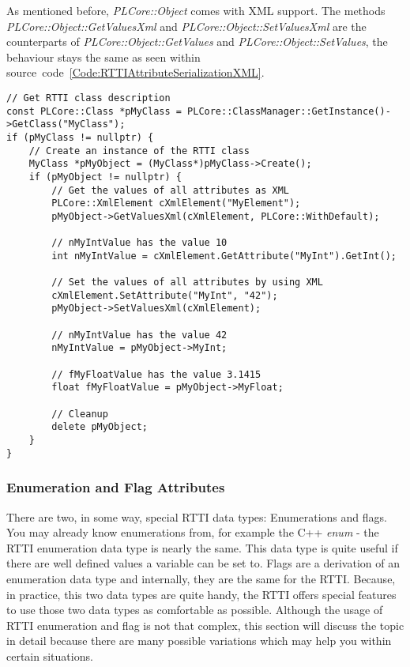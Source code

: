 As mentioned before, \emph{PLCore::Object} comes with XML support. The methods \emph{PLCore::Object::GetValuesXml} and \emph{PLCore::Object::SetValuesXml} are the counterparts of \emph{PLCore::Object::GetValues} and \emph{PLCore::Object::SetValues}, the behaviour stays the same as seen within source~code~\ref{Code:RTTIAttributeSerializationXML}.
\begin{lstlisting}[label=Code:RTTIAttributeSerializationXML,caption={RTTI object attributes serialization by using XML}]
// Get RTTI class description
const PLCore::Class *pMyClass = PLCore::ClassManager::GetInstance()->GetClass("MyClass");
if (pMyClass != nullptr) {
	// Create an instance of the RTTI class
	MyClass *pMyObject = (MyClass*)pMyClass->Create();
	if (pMyObject != nullptr) {
		// Get the values of all attributes as XML
		PLCore::XmlElement cXmlElement("MyElement");
		pMyObject->GetValuesXml(cXmlElement, PLCore::WithDefault);

		// nMyIntValue has the value 10
		int nMyIntValue = cXmlElement.GetAttribute("MyInt").GetInt();

		// Set the values of all attributes by using XML
		cXmlElement.SetAttribute("MyInt", "42");
		pMyObject->SetValuesXml(cXmlElement);

		// nMyIntValue has the value 42
		nMyIntValue = pMyObject->MyInt;

		// fMyFloatValue has the value 3.1415
		float fMyFloatValue = pMyObject->MyFloat;

		// Cleanup
		delete pMyObject;
	}
}
\end{lstlisting}



\subsubsection{Enumeration and Flag Attributes}
\label{ClassMembers:EnumerationAndFlagAttributes}
There are two, in some way, special RTTI data types: Enumerations and flags. You may already know enumerations from, for example the C++ \emph{enum} - the RTTI enumeration data type is nearly the same. This data type is quite useful if there are well defined values a variable can be set to. Flags are a derivation of an enumeration data type and internally, they are the same for the RTTI. Because, in practice, this two data types are quite handy, the RTTI offers special features to use those two data types as comfortable as possible. Although the usage of RTTI enumeration and flag is not that complex, this section will discuss the topic in detail because there are many possible variations which may help you within certain situations.


